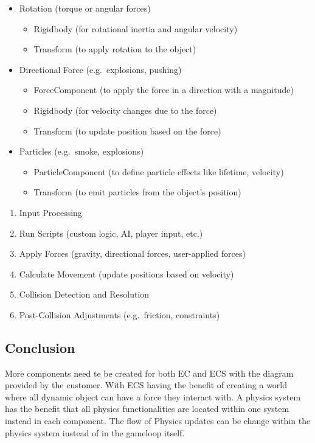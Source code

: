 \documentclass{projdoc}
\begin{document}
\begin{itemize}
	\item Rotation (torque or angular forces)
	\begin{itemize}
		\item Rigidbody (for rotational inertia and angular velocity)
		\item Transform (to apply rotation to the object)
	\end{itemize}

	\item Directional Force (e.g.~explosions, pushing)
	\begin{itemize}
		\item ForceComponent (to apply the force in a direction with a magnitude)
		\item Rigidbody (for velocity changes due to the force)
		\item Transform (to update position based on the force)
	\end{itemize}

	\item Particles (e.g.~smoke, explosions)
	\begin{itemize}
		\item ParticleComponent (to define particle effects like lifetime, velocity)
		\item Transform (to emit particles from the object’s position)
	\end{itemize}
\end{itemize}

\begin{enumerate}
	\item Input Processing
	\item Run Scripts (custom logic, AI, player input, etc.)
	\item Apply Forces (gravity, directional forces, user-applied forces)
	\item Calculate Movement (update positions based on velocity)
	\item Collision Detection and Resolution
	\item Post-Collision Adjustments (e.g.~friction, constraints)
\end{enumerate}

\subsection{Conclusion}

More components need te be created for both EC and ECS with the diagram provided by
the customer. With ECS having the benefit of creating a world where all dynamic
object can have a force they interact with. A physics system has the benefit that all
physics functionalities are located within one system instead in each component. The
flow of Physics updates can be change within the physics system instead of in the
gameloop itself.
\end{document}
